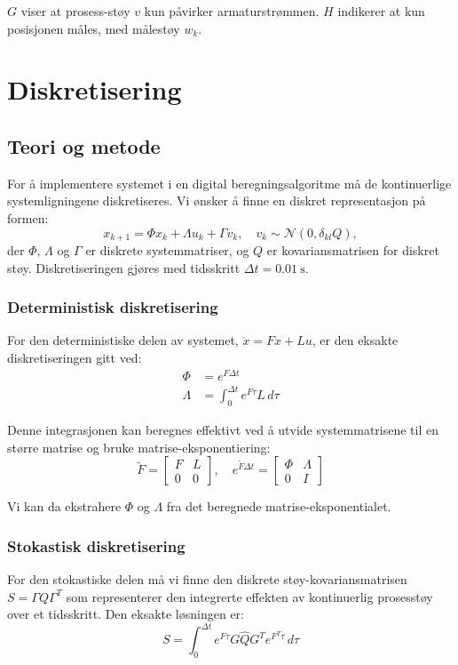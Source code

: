 \documentclass[a4paper,12pt]{article}
\theoremstyle{plain}
\begin{document}
\(G\) viser at prosess-støy \(v\) kun påvirker armaturstrømmen. \(H\) indikerer at kun posisjonen måles, med målestøy \(w_k\).
\clearpage
\section{Diskretisering}
\subsection{Teori og metode}
For å implementere systemet i en digital beregningsalgoritme må de kontinuerlige systemligningene diskretiseres. Vi ønsker å finne en diskret representasjon på formen:
\begin{equation}
x_{k+1} = \Phi x_k + \Lambda u_k + \Gamma v_k, \quad v_k \sim \mathcal{N}(0, \delta_{kl}Q),
\end{equation}
der $\Phi$, $\Lambda$ og $\Gamma$ er diskrete systemmatriser, og $Q$ er kovariansmatrisen for diskret støy. Diskretiseringen gjøres med tidsskritt $\Delta t = \SI{0.01}{\second}$.

\subsubsection{Deterministisk diskretisering}
For den deterministiske delen av systemet, $\dot{x} = Fx + Lu$, er den eksakte diskretiseringen gitt ved:
\begin{align}
\Phi &= e^{F\Delta t} \\
\Lambda &= \int_0^{\Delta t} e^{F\tau}L\,d\tau
\end{align}

Denne integrasjonen kan beregnes effektivt ved å utvide systemmatrisene til en større matrise og bruke matrise-eksponentiering:
\begin{equation}
\tilde{F} = \begin{bmatrix}
F & L \\
0 & 0
\end{bmatrix}, \quad
e^{\tilde{F} \Delta t} = \begin{bmatrix}
\Phi & \Lambda \\
0 & I
\end{bmatrix}
\end{equation}

Vi kan da ekstrahere $\Phi$ og $\Lambda$ fra det beregnede matrise-eksponentialet.

\subsubsection{Stokastisk diskretisering}
For den stokastiske delen må vi finne den diskrete støy-kovariansmatrisen $S = \Gamma Q \Gamma^T$ som representerer den integrerte effekten av kontinuerlig prosesstøy over et tidsskritt. Den eksakte løsningen er:
\begin{equation}
S = \int_0^{\Delta t} e^{F\tau}G\hat{Q}G^Te^{F^T\tau}\,d\tau
\end{equation}
\end{document}
